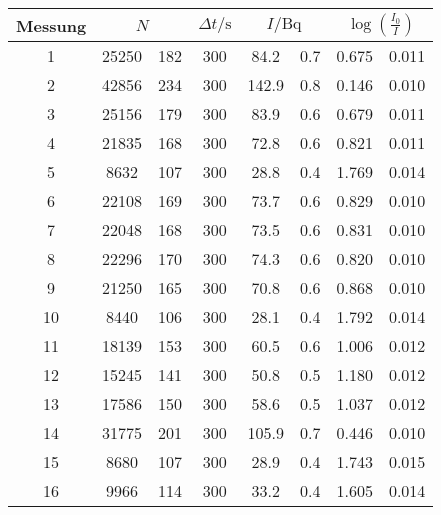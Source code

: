\label{tab:tabWuerfel5}
	\begin{tabular}{cS[table-format=5.0]@{${}\pm{}$}S[table-format=3.0]S[table-format=3.0]S[table-format=3.1]@{${}\pm{}$}S[table-format=1.1]S[table-format=1.3]@{${}\pm{}$}S[table-format=1.3]}
		\toprule
		{Messung} &  & {$\Delta t/\si{\second}$} &  &  \\
		 & 25250 & 182 & 300 & 84.2 & 0.7 & 0.675 & 0.011 \\
		 2 & 42856 & 234 & 300 & 142.9 & 0.8 & 0.146 & 0.010 \\
		 3 & 25156 & 179 & 300 & 83.9 & 0.6 & 0.679 & 0.011 \\
		 4 & 21835 & 168 & 300 & 72.8 & 0.6 & 0.821 & 0.011 \\
		 5 &  8632 & 107 & 300 & 28.8 & 0.4 & 1.769 & 0.014 \\
		 6 & 22108 & 169 & 300 & 73.7 & 0.6 & 0.829 & 0.010 \\
		 7 & 22048 & 168 & 300 & 73.5 & 0.6 & 0.831 & 0.010 \\
		 8 & 22296 & 170 & 300 & 74.3 & 0.6 & 0.820 & 0.010 \\
		 9 & 21250 & 165 & 300 & 70.8 & 0.6 & 0.868 & 0.010 \\
	    10 &  8440 & 106 & 300 & 28.1 & 0.4 & 1.792 & 0.014 \\
	    11 & 18139 & 153 & 300 & 60.5 & 0.6 & 1.006 & 0.012 \\
		12 & 15245 & 141 & 300 & 50.8 & 0.5 & 1.180 & 0.012 \\
		13 & 17586 & 150 & 300 & 58.6 & 0.5 & 1.037 & 0.012 \\
		14 & 31775 & 201 & 300 & 105.9 & 0.7 & 0.446 & 0.010 \\
		15 &  8680 & 107 & 300 & 28.9 & 0.4 & 1.743 & 0.015 \\
		16 &  9966 & 114 & 300 & 33.2 & 0.4 & 1.605 & 0.014 \\
		\bottomrule
	\end{tabular}
